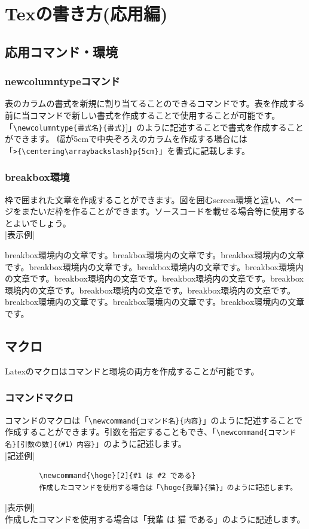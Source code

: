 \chapter{Texの書き方(応用編)}
\label{chp:tex_pro}

\section{応用コマンド・環境}
\label{sec:tex_pro_cmd}
\subsection{newcolumntypeコマンド}
\label{sub:tex_pro_cmd_newcol}
	表のカラムの書式を新規に割り当てることのできるコマンドです。表を作成する前に当コマンドで新しい書式を作成することで使用することが可能です。\\
	「\verb|\newcolumntype{書式名}{書式}|]」のように記述することで書式を作成することができます。
幅が5cmで中央ぞろえのカラムを作成する場合には\\「\verb|>{\centering\arraybackslash}p{5cm}|」を書式に記載します。

\subsection{breakbox環境}
\label{sub:tex_pro_cmd_break}
	枠で囲まれた文章を作成することができます。図を囲むscreen環境と違い、ページをまたいだ枠を作ることができます。ソースコードを載せる場合等に使用するとよいでしょう。\\
	|表示例|
\begin{breakbox}
\noindent breakbox環境内の文章です。breakbox環境内の文章です。breakbox環境内の文章です。breakbox環境内の文章です。breakbox環境内の文章です。breakbox環境内の文章です。breakbox環境内の文章です。breakbox環境内の文章です。breakbox環境内の文章です。breakbox環境内の文章です。breakbox環境内の文章です。breakbox環境内の文章です。breakbox環境内の文章です。breakbox環境内の文章です。
\end{breakbox}

\section{マクロ}
\label{sec:tex_pro_macro}
	Latexのマクロはコマンドと環境の両方を作成することが可能です。

\subsection{コマンドマクロ}
\label{sub:tex_pro_macro_cmd}
	コマンドのマクロは「\verb|\newcommand{コマンド名}{内容}|」のように記述することで作成することができます。引数を指定することもでき、「\verb|\newcommand{コマンド名}[引数の数]{（#1）内容}|」のように記述します。\\
	|記述例|
	\begin{verbatim}
		\newcommand{\hoge}[2]{#1 は #2 である}
		作成したコマンドを使用する場合は「\hoge{我輩}{猫}」のように記述します。
	\end{verbatim}
	|表示例|\\
	\newcommand{\hoge}[2]{#1 は #2 である}
	作成したコマンドを使用する場合は「\hoge{我輩}{猫}」のように記述します。

